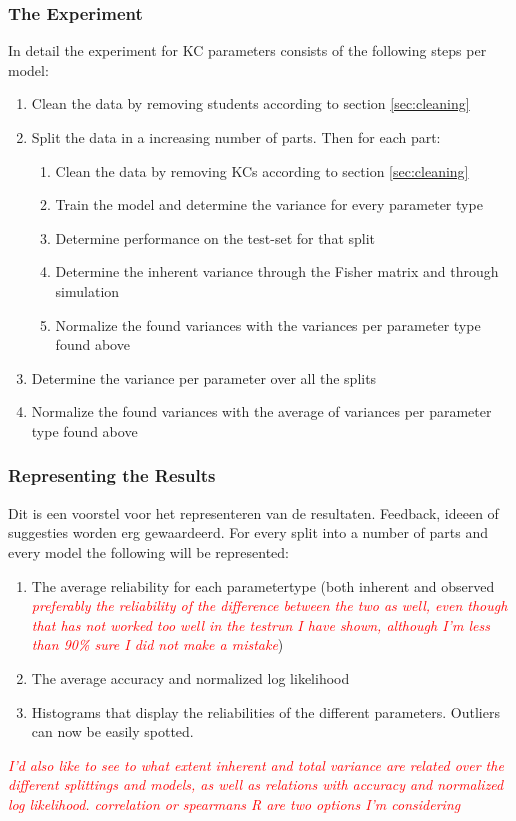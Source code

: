 \documentclass{scrartcl}
\newcommand\todo[1]{\textit{\textcolor{red}{#1}}}
\begin{document}
\subsubsection{The Experiment}
In detail the experiment for KC parameters consists of the following steps per model:
\begin{enumerate}
\item Clean the data by removing students according to section \ref{sec:cleaning}
\item Split the data in a increasing number of parts. Then for each part:
\begin{enumerate}
\item Clean the data by removing KCs according to section \ref{sec:cleaning}
\item Train the model and determine the variance for every parameter type
\item Determine performance on the test-set for that split
\item Determine the inherent variance through the Fisher matrix and through simulation
\item Normalize the found variances with the variances per parameter type found above
\end{enumerate}
\item Determine the variance per parameter over all the splits
\item Normalize the found variances with the average of variances per parameter type found above
\end{enumerate}

\subsubsection{Representing the Results}
Dit is een voorstel voor het representeren van de resultaten. Feedback, ideeen of suggesties worden erg gewaardeerd.
For every split into a number of parts and every model the following will be represented:
\begin{enumerate}
\item The average reliability for each parametertype (both inherent and observed \todo{ preferably the reliability of the difference between the two as well, even though that has not worked too well in the testrun I have shown, although I'm less than 90\% sure I did not make a mistake})
\item The average accuracy and normalized log likelihood
\item Histograms that display the reliabilities of the different parameters. Outliers can now be easily spotted.
\end{enumerate}
\todo{I'd also like to see to what extent inherent and total variance are related over the different splittings and models, as well as relations with accuracy and normalized log likelihood. correlation or spearmans R are two options I'm considering}
\end{document}
